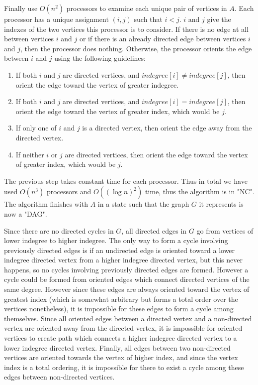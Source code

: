 \documentclass{article}
\begin{document}
\begin{enumerate}
\begin{enumerate}
\par Finally use $O(n^2)$ processors to examine each unique pair of vertices in $A$. Each processor has a unique assignment $(i,j)$ such that $i \lt j$. $i$ and $j$ give the indexes of the two vertices this processor is to consider. If there is no edge at all between vertices $i$ and $j$ or if there is an already directed edge between vertices $i$ and $j$, then the processor does nothing. Otherwise, the processor orients the edge between $i$ and $j$ using the following guidelines:
\begin{enumerate}
		\item If both $i$ and $j$ are directed vertices, and $indegree[i] \neq indegree[j]$, then orient the edge toward the vertex of greater indegree.
		
		\item If both $i$ and $j$ are directed vertices, and $indegree[i] = indegree[j]$, then orient the edge toward the vertex of greater index, which would be $j$.
		
		\item If only one of $i$ and $j$ is a directed vertex, then orient the edge away from the directed vertex.
		
		\item If neither $i$ or $j$ are directed vertices, then orient the edge toward the vertex of greater index, which would be $j$.
\end{enumerate}

\par The previous step takes constant time for each processor. Thus in total we have used $O(n^3)$ processors and $O((\log n)^2)$ time, thus the algorithm is in "NC". The algorithm finishes with $A$ in a state such that the graph $G$ it represents is now a "DAG".

\par Since there are no directed cycles in $G$, all directed edges in $G$ go from vertices of lower indegree to higher indegree.  The only way to form a cycle involving previously directed edges is if an undirected edge is oriented toward a lower indegree directed vertex from a higher indegree directed vertex, but this never happens, so no cycles involving previously directed edges are formed.  However a cycle could be formed from oriented edges which connect directed vertices of the same degree. However since these edges are always oriented toward the vertex of greatest index (which is somewhat arbitrary but forms a total order over the vertices nonetheless), it is impossible for these edges to form a cycle among themselves. Since all oriented edges between a directed vertex and a non-directed vertex are oriented away from the directed vertex, it is impossible for oriented vertices to create path which connects a higher indegree directed vertex to a lower indegree directed vertex. Finally, all edges between two non-directed vertices are oriented towards the vertex of higher index, and since the vertex index is a total ordering, it is impossible for there to exist a cycle among these edges between non-directed vertices.
\end{enumerate}

\end{enumerate}
\end{document}
